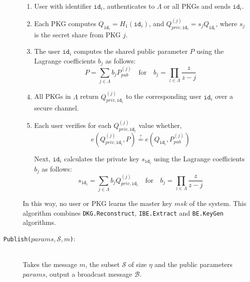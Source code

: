 \documentclass[journal]{IEEEtran}
\newcommand{\id}[1]{\ensuremath{\mathtt{id}_{#1}}}
\begin{document}
\begin{description}
    \begin{enumerate}
        \item User with identifier \id{i}, authenticates to $\Lambda$ or all PKGs and sends \id{i}.
        \item Each PKG computes $Q_{\id{i}} = H_1 \left( \id{i} \right)$, and $Q_{priv,\id{i}}^{(j)} = s_j Q_{\id{i}}$, where $s_j$ is the secret share from PKG $j$.
        \item The user $\id{i}$ computes the shared public parameter $P$ using the Lagrange coefficients $b_j$ as follows:
        \begin{equation*}
         P = \sum_{j \in \Lambda} b_j P_{pub}^{\left( j \right)} \quad \textrm{for} \quad b_j = \prod_{z \in \Lambda} \frac{z}{z-j}
        \end{equation*}
        \item All PKGs in $\Lambda$ return $Q_{priv,\id{i}}^{(j)}$ to the corresponding user $\id{i}$ over a secure channel.
        \item Each user verifies for each $Q_{priv,\id{i}}^{(j)}$ value whether, 
        \begin{equation*}
            e \left( Q_{priv , \id{i} }^{(j)}, P \right ) \stackrel{?}{=} e \left( Q_{\id{i}}, P_{pub}^{(j)} \right)
        \end{equation*}
        
        Next, $\id{i}$ calculates the private key $s_{\id{i}}$ using the Lagrange coefficients $b_j$ as follows: 
        \begin{equation*}
            s_{\id{i}} = \sum\limits_{j\in\Lambda} b_j Q_{priv,\id{i}}^{(j)} \quad \textrm{for} \quad b_j = \prod_{z\in \Lambda} \frac{z}{z-j}
        \end{equation*}
        \end{enumerate}
        In this way, no user or PKG learns the master key $msk$ of the system. This algorithm combines \texttt{DKG.Reconstruct}, \texttt{IBE.Extract} and \texttt{BE.KeyGen} algorithms.
        \bigskip
\item[\texttt{Publish($params, \mathcal{S}, m$)}:]~\\ Takes the message $m$, the subset $\mathcal{S}$ of size $\eta$ and the public parameters $params$, output a broadcast message $\mathcal{B}$.


\end{description}
\end{document}
